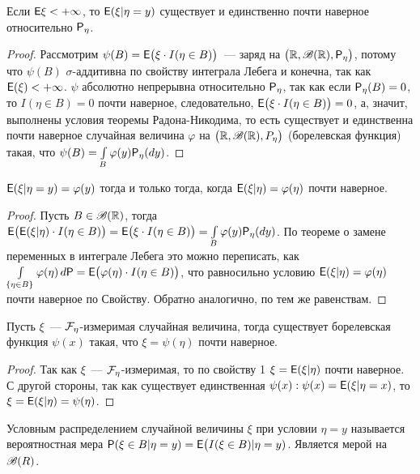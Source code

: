  \begin{lemma}
 	Если $\E \xi < +\infty$, то $\E( \xi | \eta = y)$ существует и единственно почти наверное относительно $\P_\eta$.
 	\begin{proof}
 		Рассмотрим $\psi(B) = \E \big( \xi \cdot I (\eta \in B) \big)$~--- заряд на $\big( \R, \B(\R), \P_\eta \big)$, потому что $\psi(B)$ $\sigma$-аддитивна по свойству интеграла Лебега и конечна, так как $\E(\xi) < +\infty$. $\psi$ абсолютно непрерывна относительно $\P_\eta$, так как если $\P_\eta(B) = 0$, то $I(\eta \in B) = 0$ почти наверное, следовательно, $\E \big( \xi \cdot I (\eta \in B) \big) = 0$, а, значит, выполнены условия теоремы Радона-Никодима, то есть существует и единственна почти наверное случайная величина $\varphi$ на $\big( \R, \B(\R), P_\eta \big)$ (борелевская функция) такая, что $\psi(B) = \int\limits_B \varphi(y) \P_\eta(dy)$.
 	\end{proof}
 \end{lemma}
 
 \begin{lemma}
 	$\E ( \xi | \eta = y) = \varphi(y)$ тогда и только тогда, когда $\E(\xi | \eta) = \varphi(\eta)$ почти наверное.
 	\begin{proof}
 		Пусть $B \in \B(\R)$, тогда $\E \big( \E(\xi | \eta) \cdot I (\eta \in B) \big) = \E \big( \xi \cdot I(\eta \in B) \big) = \int\limits_B \varphi(y) \P_\eta(d y)$. По теореме о замене переменных в интеграле Лебега это можно переписать, как $\int\limits_{\{\eta \in B \}} \varphi(\eta) \, d \P = \E \big( \varphi(\eta) \cdot I (\eta \in B) \big)$, что равносильно условию $\E(\xi | \eta) = \varphi(\eta)$ почти наверное по Свойству. Обратно аналогично, по тем же равенствам.
 	\end{proof}
 \end{lemma}
 
 \begin{consequence}
 	Пусть $\xi$~--- $\F_\eta$-измеримая случайная величина, тогда существует борелевская функция $\psi(x)$ такая, что $\xi = \psi(\eta)$ почти наверное. 
 	\begin{proof}
 		Так как $\xi$~--- $\F_\eta$-измеримая, то по свойству 1 $\xi = \E(\xi | \eta)$ почти наверное. С другой стороны, так как существует единственная $\psi(x) : \psi(x) = \E(\xi | \eta = x)$, то $\xi = \E(\xi | \eta) = \psi(\eta)$.
 	\end{proof}	
 \end{consequence}
 
 \begin{definition}
 	Условным распределением случайной величины $\xi$ при условии $\eta = y$ называется вероятностная мера $\P (\xi \in B | \eta = y) = \E  \big( I(\xi \in B) | \eta = y)$. 
 	 Является мерой на $\B(R)$.
 \end{definition}
 
